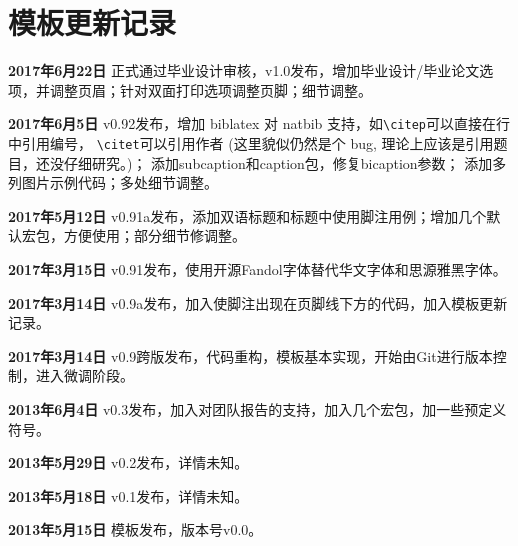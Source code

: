 \chapter{模板更新记录}
\label{chap:updatelog}

\textbf{2017年6月22日} \nuaathesis 正式通过毕业设计审核，v1.0发布，增加毕业设计/毕业论文选项，并调整页眉；针对双面打印选项调整页脚；细节调整。

\textbf{2017年6月5日} v0.92发布，增加 biblatex 对 natbib 支持，如\verb!\citep!可以直接在行中引用编号， \verb!\citet!可以引用作者 (这里貌似仍然是个 bug, 理论上应该是引用题目，还没仔细研究。)； 添加subcaption和caption包，修复bicaption参数； 添加多列图片示例代码；多处细节调整。

\textbf{2017年5月12日} v0.91a发布，添加双语标题和标题中使用脚注用例；增加几个默认宏包，方便使用；部分细节修调整。

\textbf{2017年3月15日} v0.91发布，使用开源Fandol字体替代华文字体和思源雅黑字体。

\textbf{2017年3月14日} v0.9a发布，加入使脚注出现在页脚线下方的代码，加入模板更新记录。

\textbf{2017年3月14日} v0.9跨版发布，代码重构，模板基本实现，开始由Git进行版本控制，进入微调阶段。

\textbf{2013年6月4日} v0.3发布，加入对团队报告的支持，加入几个宏包，加一些预定义符号。

\textbf{2013年5月29日} v0.2发布，详情未知。

\textbf{2013年5月18日} v0.1发布，详情未知。

\textbf{2013年5月15日} 模板发布，版本号v0.0。

